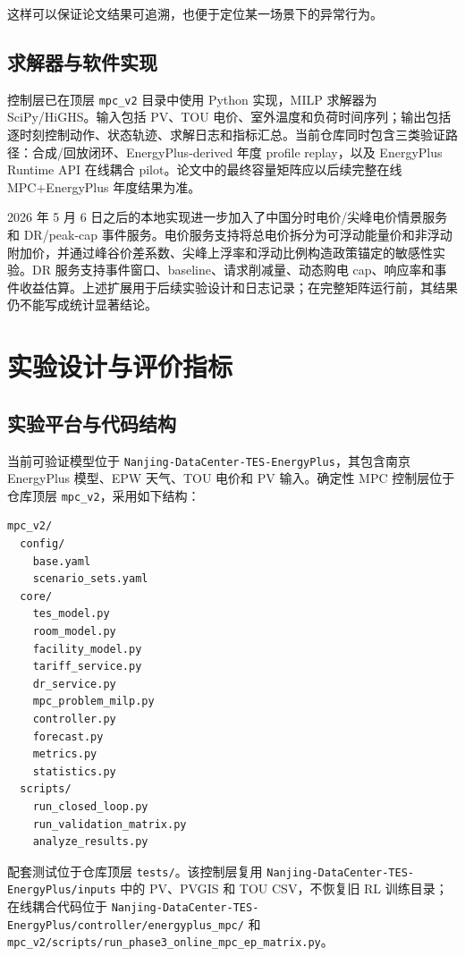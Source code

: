 \documentclass[UTF8,a4paper,12pt]{ctexrep}
\begin{document}
这样可以保证论文结果可追溯，也便于定位某一场景下的异常行为。

\section{求解器与软件实现}

控制层已在顶层 \texttt{mpc\_v2} 目录中使用 Python 实现，MILP 求解器为 SciPy/HiGHS。输入包括 PV、TOU 电价、室外温度和负荷时间序列；输出包括逐时刻控制动作、状态轨迹、求解日志和指标汇总。当前仓库同时包含三类验证路径：合成/回放闭环、EnergyPlus-derived 年度 profile replay，以及 EnergyPlus Runtime API 在线耦合 pilot。论文中的最终容量矩阵应以后续完整在线 MPC+EnergyPlus 年度结果为准。

2026 年 5 月 6 日之后的本地实现进一步加入了中国分时电价/尖峰电价情景服务和 DR/peak-cap 事件服务。电价服务支持将总电价拆分为可浮动能量价和非浮动附加价，并通过峰谷价差系数、尖峰上浮率和浮动比例构造政策锚定的敏感性实验。DR 服务支持事件窗口、baseline、请求削减量、动态购电 cap、响应率和事件收益估算。上述扩展用于后续实验设计和日志记录；在完整矩阵运行前，其结果仍不能写成统计显著结论。

\chapter{实验设计与评价指标}

\section{实验平台与代码结构}

当前可验证模型位于 \texttt{Nanjing-DataCenter-TES-EnergyPlus}，其包含南京 EnergyPlus 模型、EPW 天气、TOU 电价和 PV 输入。确定性 MPC 控制层位于仓库顶层 \texttt{mpc\_v2}，采用如下结构：

\begin{verbatim}
mpc_v2/
  config/
    base.yaml
    scenario_sets.yaml
  core/
    tes_model.py
    room_model.py
    facility_model.py
    tariff_service.py
    dr_service.py
    mpc_problem_milp.py
    controller.py
    forecast.py
    metrics.py
    statistics.py
  scripts/
    run_closed_loop.py
    run_validation_matrix.py
    analyze_results.py
\end{verbatim}

配套测试位于仓库顶层 \texttt{tests/}。该控制层复用 \texttt{Nanjing-DataCenter-TES-EnergyPlus/inputs} 中的 PV、PVGIS 和 TOU CSV，不恢复旧 RL 训练目录；在线耦合代码位于 \texttt{Nanjing-DataCenter-TES-EnergyPlus/controller/energyplus_mpc/} 和 \texttt{mpc\_v2/scripts/run\_phase3\_online\_mpc\_ep\_matrix.py}。
\end{document}

